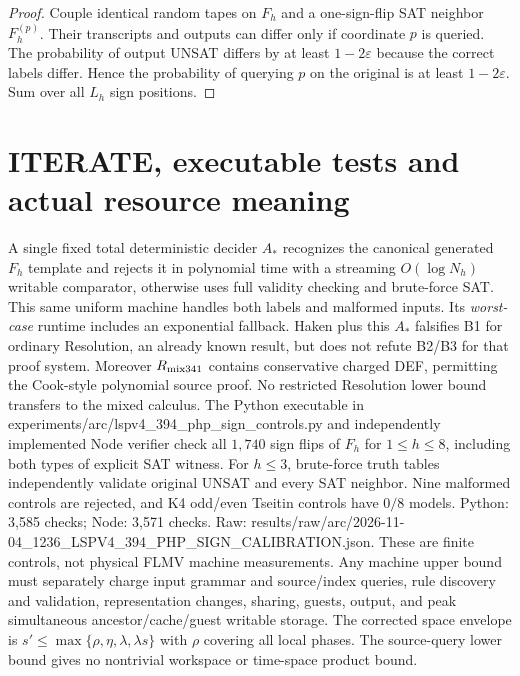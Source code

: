 \documentclass[11pt]{article}
\begin{document}
\begin{proof}
Couple identical random tapes on $F_h$ and a one-sign-flip SAT neighbor $F_h^{(p)}$. Their transcripts and outputs can differ only if coordinate $p$ is queried. The probability of output UNSAT differs by at least $1-2\varepsilon$ because the correct labels differ. Hence the probability of querying $p$ on the original is at least $1-2\varepsilon$. Sum over all $L_h$ sign positions.
\end{proof}
\section*{ITERATE, executable tests and actual resource meaning}
A single fixed total deterministic decider $A_*$ recognizes the canonical generated $F_h$ template and rejects it in polynomial time with a streaming $O(\log N_h)$ writable comparator, otherwise uses full validity checking and brute-force SAT. This same uniform machine handles both labels and malformed inputs. Its \emph{worst-case} runtime includes an exponential fallback. Haken plus this $A_*$ falsifies B1 for ordinary Resolution, an already known result, but does not refute B2/B3 for that proof system. Moreover $R_{\rm mix341}$ contains conservative charged DEF, permitting the Cook-style polynomial source proof. No restricted Resolution lower bound transfers to the mixed calculus.
The Python executable in experiments/arc/lspv4_394_php_sign_controls.py and independently implemented Node verifier check all $1,740$ sign flips of $F_h$ for $1\le h\le8$, including both types of explicit SAT witness. For $h\le3$, brute-force truth tables independently validate original UNSAT and every SAT neighbor. Nine malformed controls are rejected, and K4 odd/even Tseitin controls have $0/8$ models. Python: 3,585 checks; Node: 3,571 checks. Raw: results/raw/arc/2026-11-04_1236_LSPV4_394_PHP_SIGN_CALIBRATION.json. These are finite controls, not physical FLMV machine measurements.
Any machine upper bound must separately charge input grammar and source/index queries, rule discovery and validation, representation changes, sharing, guests, output, and peak simultaneous ancestor/cache/guest writable storage. The corrected space envelope is $s'\le\max\{\rho,\eta,\lambda,\lambda s\}$ with $\rho$ covering all local phases. The source-query lower bound gives no nontrivial workspace or time-space product bound.
\end{document}
